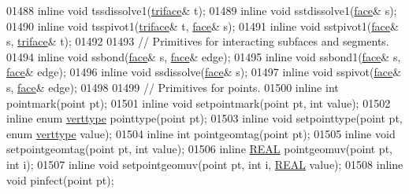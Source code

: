\begin{DoxyCode}
01488   \textcolor{keyword}{inline} \textcolor{keywordtype}{void} tssdissolve1(\hyperlink{classtetgenmesh_1_1triface}{triface}& t);
01489   \textcolor{keyword}{inline} \textcolor{keywordtype}{void} sstdissolve1(\hyperlink{classtetgenmesh_1_1face}{face}& s);
01490   \textcolor{keyword}{inline} \textcolor{keywordtype}{void} tsspivot1(\hyperlink{classtetgenmesh_1_1triface}{triface}& t, \hyperlink{classtetgenmesh_1_1face}{face}& s);
01491   \textcolor{keyword}{inline} \textcolor{keywordtype}{void} sstpivot1(\hyperlink{classtetgenmesh_1_1face}{face}& s, \hyperlink{classtetgenmesh_1_1triface}{triface}& t);
01492 
01493   \textcolor{comment}{// Primitives for interacting subfaces and segments.}
01494   \textcolor{keyword}{inline} \textcolor{keywordtype}{void} ssbond(\hyperlink{classtetgenmesh_1_1face}{face}& s, \hyperlink{classtetgenmesh_1_1face}{face}& edge);
01495   \textcolor{keyword}{inline} \textcolor{keywordtype}{void} ssbond1(\hyperlink{classtetgenmesh_1_1face}{face}& s, \hyperlink{classtetgenmesh_1_1face}{face}& edge);
01496   \textcolor{keyword}{inline} \textcolor{keywordtype}{void} ssdissolve(\hyperlink{classtetgenmesh_1_1face}{face}& s);
01497   \textcolor{keyword}{inline} \textcolor{keywordtype}{void} sspivot(\hyperlink{classtetgenmesh_1_1face}{face}& s, \hyperlink{classtetgenmesh_1_1face}{face}& edge);
01498 
01499   \textcolor{comment}{// Primitives for points.}
01500   \textcolor{keyword}{inline} \textcolor{keywordtype}{int}  pointmark(point pt);
01501   \textcolor{keyword}{inline} \textcolor{keywordtype}{void} setpointmark(point pt, \textcolor{keywordtype}{int} value);
01502   \textcolor{keyword}{inline} \textcolor{keyword}{enum} \hyperlink{classtetgenmesh_ad0458f823a5eef2de89c7fae067aa2ac}{verttype} pointtype(point pt);
01503   \textcolor{keyword}{inline} \textcolor{keywordtype}{void} setpointtype(point pt, \textcolor{keyword}{enum} \hyperlink{classtetgenmesh_ad0458f823a5eef2de89c7fae067aa2ac}{verttype} value);
01504   \textcolor{keyword}{inline} \textcolor{keywordtype}{int}  pointgeomtag(point pt);
01505   \textcolor{keyword}{inline} \textcolor{keywordtype}{void} setpointgeomtag(point pt, \textcolor{keywordtype}{int} value);
01506   \textcolor{keyword}{inline} \hyperlink{tetgen_8h_a4b654506f18b8bfd61ad2a29a7e38c25}{REAL} pointgeomuv(point pt, \textcolor{keywordtype}{int} i);
01507   \textcolor{keyword}{inline} \textcolor{keywordtype}{void} setpointgeomuv(point pt, \textcolor{keywordtype}{int} i, \hyperlink{tetgen_8h_a4b654506f18b8bfd61ad2a29a7e38c25}{REAL} value);
01508   \textcolor{keyword}{inline} \textcolor{keywordtype}{void} pinfect(point pt);

\end{DoxyCode}
